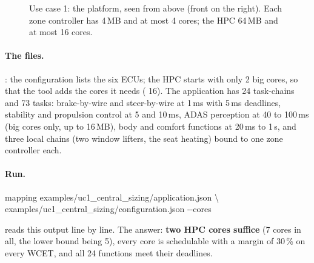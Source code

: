 \begin{figure}[ht]
\centering
{}
\caption{Use case 1: the platform, seen from above (front on the right).
Each zone controller has 4\,MB and at most 4 cores; the HPC 64\,MB and at
most 16 cores.}
\label{fig:uc1}
\end{figure}

\paragraph{The files.} : the
configuration lists the six ECUs; the HPC starts with only 2 big cores,
so that the tool adds the cores it needs ( 16). The
application has 24 task-chains and 73 tasks: brake-by-wire and
steer-by-wire at 1\,ms with 5\,ms deadlines, stability and propulsion
control at 5 and 10\,ms, ADAS perception at 40 to 100\,ms (big cores only,
up to 16\,MB), body and comfort functions at 20\,ms to 1\,s, and three
local chains (two window lifters, the seat heating) bound to one zone
controller each.

\paragraph{Run.}
\begin{shell}
mapping examples/uc1\_central\_sizing/application.json \textbackslash\\
\quad examples/uc1\_central\_sizing/configuration.json -{}-cores
\end{shell}
 reads this output line by line. The answer: \textbf{two
HPC cores suffice} (7 cores in all, the lower bound being 5), every core
is schedulable with a margin of 30\,\% on every WCET, and all 24 functions
meet their deadlines.

